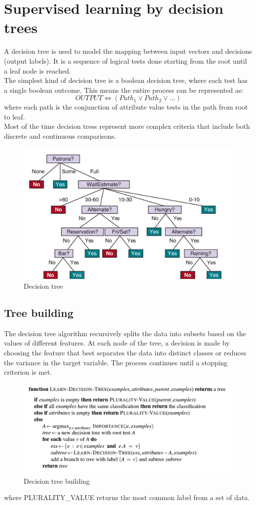 \documentclass[a4paper,12pt,answers]{article}
\begin{document}
	\section{Supervised learning by decision trees}
	A decision tree is used to model the mapping between input vectors and decisions (output labels). It is a sequence of logical tests done starting from the root until a leaf node is reached.
	\\[4pt]
	The simplest kind of decision tree is a boolean decision tree, where each test has a single boolean outcome. This means the entire process can be represented as:
	\[
	OUTPUT \iff \left( Path_1 \lor Path_2 \lor \dots \right)
	\]
	where each path is the conjunction of attribute value tests in the path from root to leaf.
	\\[4pt]
	\noindent
	Most of the time decision tress represent more complex criteria that include both discrete and continuous comparisons. 
	\begin{figure}[H]
		\centering
		\includegraphics[width=0.7\linewidth]{dec_tree}
		\caption{Decision tree}
		\label{fig:dectree}
	\end{figure}
	
	\newpage
	\subsection{Tree building}
	The decision tree algorithm recursively splits the data into subsets based on the values of different features. At each node of the tree, a decision is made by choosing the feature that best separates the data into distinct classes or reduces the variance in the target variable. The process continues until a stopping criterion is met.
	\begin{figure}[H]
		\centering
		\includegraphics[width=0.7\linewidth]{dec_tree_building}
		\caption{Decision tree building}
		\label{fig:dectreebuilding}
	\end{figure}
	\noindent
	where PLURALITY\_VALUE returns the most common label from a set of data.
	
\end{document}
